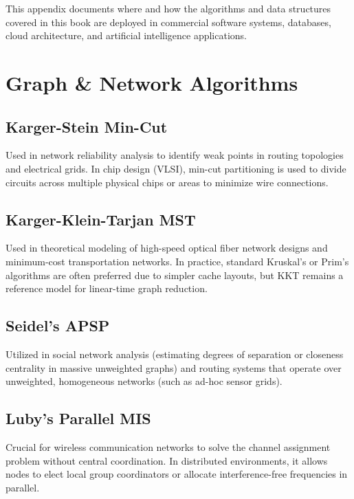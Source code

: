 \documentclass[twoside,12pt]{book}
\theoremstyle{plain}
\theoremstyle{definition}
\theoremstyle{remark}
\begin{document}
This appendix documents where and how the algorithms and data structures covered in 
this book are deployed in commercial software systems, databases, cloud architecture, 
and artificial intelligence applications.

\section{Graph \& Network Algorithms}

\subsection{Karger-Stein Min-Cut}
Used in network reliability analysis to identify weak points in routing topologies 
and electrical grids. In chip design (VLSI), min-cut partitioning is used to divide 
circuits across multiple physical chips or areas to minimize wire connections.

\subsection{Karger-Klein-Tarjan MST}
Used in theoretical modeling of high-speed optical fiber network designs and minimum-cost 
transportation networks. In practice, standard Kruskal's or Prim's algorithms are 
often preferred due to simpler cache layouts, but KKT remains a reference model for 
linear-time graph reduction.

\subsection{Seidel's APSP}
Utilized in social network analysis (estimating degrees of separation or closeness 
centrality in massive unweighted graphs) and routing systems that operate over 
unweighted, homogeneous networks (such as ad-hoc sensor grids).

\subsection{Luby's Parallel MIS}
Crucial for wireless communication networks to solve the channel assignment problem 
without central coordination. In distributed environments, it allows nodes to 
elect local group coordinators or allocate interference-free frequencies in parallel.

\end{document}
